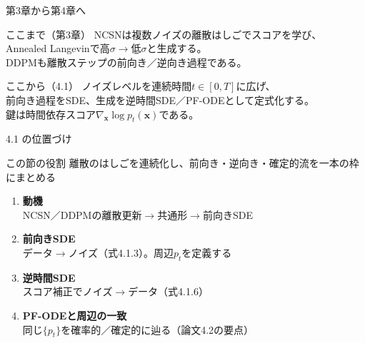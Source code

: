 

\begin{frame}{第3章から第4章へ}
    \begin{block}{ここまで（第3章）}
        NCSNは複数ノイズの離散はしごでスコアを学び、\\
        Annealed Langevinで高$\sigma\to$低$\sigma$と生成する。\\
        DDPMも離散ステップの前向き／逆向き過程である。
    \end{block}
    \begin{block}{ここから（4.1）}
        ノイズレベルを連続時間$t\in[0,T]$に広げ、\\
        前向き過程をSDE、生成を逆時間SDE／PF-ODEとして定式化する。\\
        鍵は時間依存スコア$\nabla_{\bm{x}}\log p_t(\bm{x})$である。
    \end{block}
\end{frame}
\asmain
\begin{frame}{4.1 の位置づけ}
    \begin{block}{この節の役割}
        離散のはしごを連続化し、前向き・逆向き・確定的流を一本の枠にまとめる
    \end{block}
    \begin{enumerate}
        \item \textbf{動機}\\
        NCSN／DDPMの離散更新$\to$共通形$\to$前向きSDE
        \item \textbf{前向きSDE}\\
        データ$\to$ノイズ（式4.1.3）。周辺$p_t$を定義する
        \item \textbf{逆時間SDE}\\
        スコア補正でノイズ$\to$データ（式4.1.6）
        \item \textbf{PF-ODEと周辺の一致}\\
        同じ$\{p_t\}$を確率的／確定的に辿る（論文4.2の要点）
    \end{enumerate}
\end{frame}
